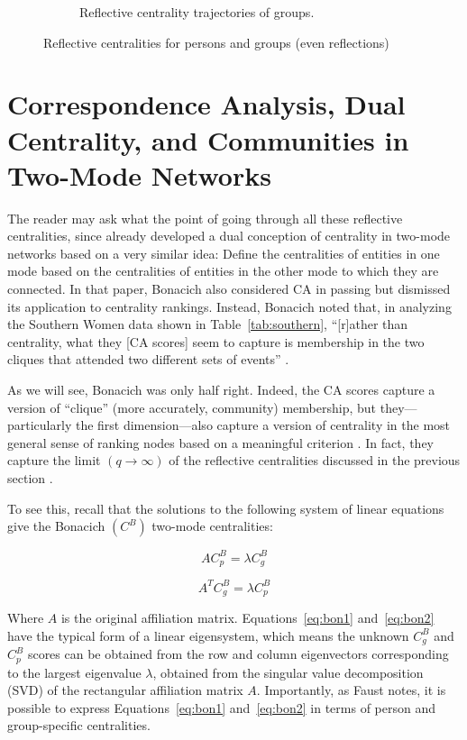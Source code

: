 \documentclass[a4paper,fleqn]{cas-sc}
\begin{document}
\begin{figure}[ht!]
\begin{subfigure}[b]{0.45\textwidth}
            \caption{Reflective centrality trajectories of groups.}
            \label{fig:g-refs}
    \end{subfigure}
    \caption{Reflective centralities for persons and groups (even reflections)}
    \label{fig:refs}
\end{figure}

\section{Correspondence Analysis, Dual Centrality, and Communities in Two-Mode Networks} \label{sec:ca}
The reader may ask what the point of going through all these reflective centralities, since \citet{bonacich1991simultaneous} already developed a dual conception of centrality in two-mode networks based on a very similar idea: Define the centralities of entities in one mode based on the centralities of entities in the other mode to which they are connected. In that paper, Bonacich also considered CA in passing but dismissed its application to centrality rankings. Instead, Bonacich noted that, in analyzing the Southern Women data shown in Table~\ref{tab:southern}, ``[r]ather than centrality, what they [CA scores] seem to capture is membership in the two cliques that attended two different sets of events'' \citeyearpar[164]{bonacich1991simultaneous}. 

As we will see, Bonacich was only half right. Indeed, the CA scores capture a version of ``clique'' (more accurately, community) membership, but they---particularly the first dimension---also capture a version of centrality in the most general sense of ranking nodes based on a meaningful criterion \citep{borgatti2006graph}. In fact, they capture the limit $(q \rightarrow \infty)$ of the reflective centralities discussed in the previous section \citep{mealy2019interpreting}. 

To see this, recall that the solutions to the following system of linear equations give the Bonacich $(C^B)$ two-mode centralities:

\begin{equation}
    AC^B_p = \lambda C^B_g 
    \label{eq:bon1}
\end{equation}

\begin{equation}
    A^TC^B_g = \lambda C^B_p 
    \label{eq:bon2}
\end{equation}

Where $A$ is the original affiliation matrix. Equations~\ref{eq:bon1} and~\ref{eq:bon2} have the typical form of a linear eigensystem, which means the unknown $C^B_g$ and $C^B_p$ scores can be obtained from the row and column eigenvectors corresponding to the largest eigenvalue $\lambda$, obtained from the singular value decomposition (SVD) of the rectangular affiliation matrix $A$. Importantly, as Faust \citeyearpar[170]{faust1997centrality} notes, it is possible to express Equations~\ref{eq:bon1} and~\ref{eq:bon2} in terms of person and group-specific centralities. 
\end{document}
